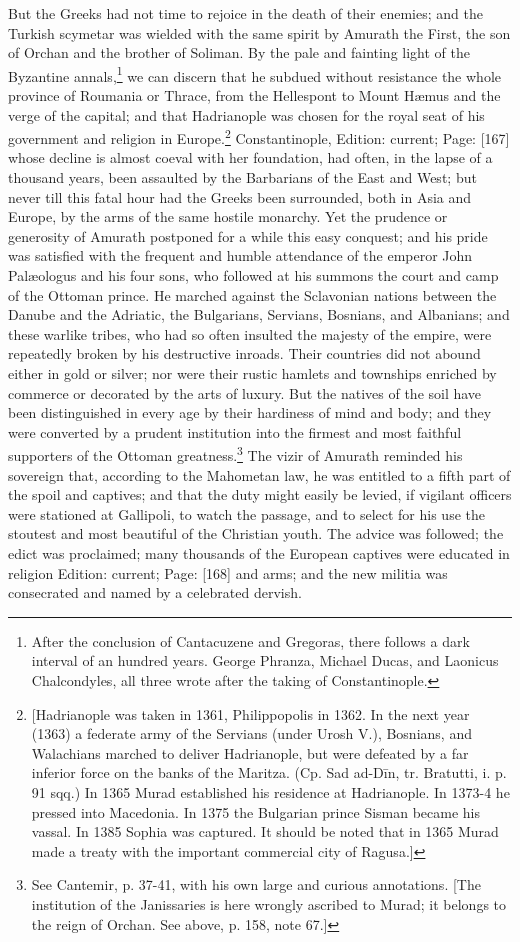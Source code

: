 But the Greeks had not time to rejoice in the death of their enemies; and the Turkish scymetar was wielded with the same spirit by Amurath the First, the son of Orchan and the brother of Soliman. By the pale and fainting light of the Byzantine annals,\footnote{After the conclusion of Cantacuzene and Gregoras, there follows a dark interval of an hundred years. George Phranza, Michael Ducas, and Laonicus Chalcondyles, all three wrote after the taking of Constantinople.} we can discern that he subdued without resistance the whole province of Roumania or Thrace, from the Hellespont to Mount Hæmus and the verge of the capital; and that Hadrianople was chosen for the royal seat of his government and religion in Europe.\footnote{[Hadrianople was taken in 1361, Philippopolis in 1362. In the next year (1363) a federate army of the Servians (under Urosh V.), Bosnians, and Walachians marched to deliver Hadrianople, but were defeated by a far inferior force on the banks of the Maritza. (Cp. Sad ad-Dīn, tr. Bratutti, i. p. 91 sqq.) In 1365 Murad established his residence at Hadrianople. In 1373-4 he pressed into Macedonia. In 1375 the Bulgarian prince Sisman became his vassal. In 1385 Sophia was captured. It should be noted that in 1365 Murad made a treaty with the important commercial city of Ragusa.]} Constantinople, Edition: current; Page: [167] whose decline is almost coeval with her foundation, had often, in the lapse of a thousand years, been assaulted by the Barbarians of the East and West; but never till this fatal hour had the Greeks been surrounded, both in Asia and Europe, by the arms of the same hostile monarchy. Yet the prudence or generosity of Amurath postponed for a while this easy conquest; and his pride was satisfied with the frequent and humble attendance of the emperor John Palæologus and his four sons, who followed at his summons the court and camp of the Ottoman prince. He marched against the Sclavonian nations between the Danube and the Adriatic, the Bulgarians, Servians, Bosnians, and Albanians; and these warlike tribes, who had so often insulted the majesty of the empire, were repeatedly broken by his destructive inroads. Their countries did not abound either in gold or silver; nor were their rustic hamlets and townships enriched by commerce or decorated by the arts of luxury. But the natives of the soil have been distinguished in every age by their hardiness of mind and body; and they were converted by a prudent institution into the firmest and most faithful supporters of the Ottoman greatness.\footnote{See Cantemir, p. 37-41, with his own large and curious annotations. [The institution of the Janissaries is here wrongly ascribed to Murad; it belongs to the reign of Orchan. See above, p. 158, note 67.]} The vizir of Amurath reminded his sovereign that, according to the Mahometan law, he was entitled to a fifth part of the spoil and captives; and that the duty might easily be levied, if vigilant officers were stationed at Gallipoli, to watch the passage, and to select for his use the stoutest and most beautiful of the Christian youth. The advice was followed; the edict was proclaimed; many thousands of the European captives were educated in religion Edition: current; Page: [168] and arms; and the new militia was consecrated and named by a celebrated dervish. 